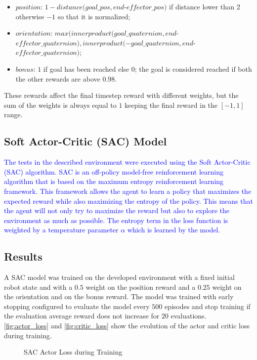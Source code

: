\begin{itemize}
    \item $position$: $1-distance(goal\_pos, end$-$effector\_pos)$ if distance lower than 2 otherwise $-1$ so that it is normalized;
    \item $orientation$: $max(innerproduct(goal\_quaternion, end$-$effector\_quaternion), innerproduct(-goal\_quaternion, end$-$effector\_quaternion)$;
    \item $bonus$: $1$ if goal has been reached else $0$; the goal is considered reached if both the other rewards are above $0.98$.
\end{itemize}

These rewards affect the final timestep reward with different weights, but the sum of the weights is always equal to $1$ keeping the final reward in the $[-1, 1]$ range.

\subsection{Soft Actor-Critic (SAC) Model}

\textcolor{blue}{The tests in the described environment were executed using the Soft Actor-Critic (SAC) algorithm. SAC is an off-policy model-free reinforcement learning algorithm that is based on the maximum entropy reinforcement learning framework. This framework allows the agent to learn a policy that maximizes the expected reward while also maximizing the entropy of the policy. This means that the agent will not only try to maximize the reward but also to explore the environment as much as possible. The entropy term in the loss function is weighted by a temperature parameter $\alpha$ which is learned by the model.}

\subsection{Results}

A SAC model was trained on the developed environment with a fixed initial robot state and with a $0.5$ weight on the position reward and a $0.25$ weight on the orientation and on the bonus reward. The model was trained with early stopping configured to evaluate the model every $500$ episodes and stop training if the evaluation average reward does not increase for $20$ evaluations. \autoref{fig:actor_loss} and \autoref{fig:critic_loss} show the evolution of the actor and critic loss during training.

\begin{figure}[H]%
    \centering
    {\fontsize{8}{11}\selectfont}
    \caption{SAC Actor Loss during Training}
    \label{fig:actor_loss}
\end{figure}

